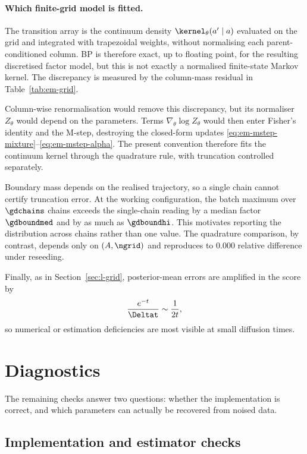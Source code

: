 \paragraph{Which finite-grid model is fitted.}
The transition array is the continuum density
$\kernel_\theta(a'\mid a)$ evaluated on the grid and integrated with
trapezoidal weights, without normalising each parent-conditioned column.
BP is therefore exact, up to floating point, for the resulting discretised
factor model, but this is not exactly a normalised finite-state Markov kernel.
The discrepancy is measured by the column-mass residual in
Table~\ref{tab:em-grid}.

Column-wise renormalisation would remove this discrepancy, but its normaliser
$Z_\theta$ would depend on the parameters. Terms
$\nabla_\theta\log Z_\theta$ would then enter Fisher's identity and the
M-step, destroying the closed-form updates
\eqref{eq:em-mstep-mixture}--\eqref{eq:em-mstep-alpha}. The present convention
therefore fits the continuum kernel through the quadrature rule, with
truncation controlled separately.

\begin{remark}
\label{rmk:em-boundary}
Boundary mass depends on the realised trajectory, so a single chain cannot
certify truncation error. At the working configuration, the batch maximum over
$\gdchains$ chains exceeds the single-chain reading by a median factor
$\gdboundmed$ and by as much as $\gdboundhi$. This motivates reporting the
distribution across chains rather than one value. The quadrature comparison,
by contrast, depends only on $(A,\ngrid)$ and reproduces to $0.000$ relative
difference under reseeding.
\end{remark}

Finally, as in Section~\ref{sec:l-grid}, posterior-mean errors are amplified in
the score by
\[
  \frac{e^{-t}}{\Deltat}\sim\frac{1}{2t},
\]
so numerical or estimation deficiencies are most visible at small diffusion
times.

\section{Diagnostics}\label{sec:em-diagnostics}

The remaining checks answer two questions: whether the implementation is
correct, and which parameters can actually be recovered from noised data.

\subsection{Implementation and estimator checks}

